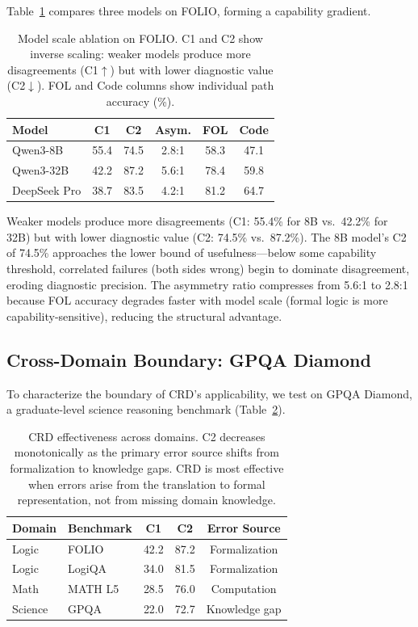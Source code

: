 \documentclass[11pt,a4paper]{article}
\begin{document}
Table~\ref{tab:scale} compares three models on FOLIO, forming a capability gradient.

\begin{table}[t]
\centering
\small
\begin{tabular}{lccccc}
\toprule
\textbf{Model} & \textbf{C1} & \textbf{C2} & \textbf{Asym.} & \textbf{FOL} & \textbf{Code} \\
\midrule
Qwen3-8B & 55.4 & 74.5 & 2.8:1 & 58.3 & 47.1 \\
Qwen3-32B & 42.2 & 87.2 & 5.6:1 & 78.4 & 59.8 \\
DeepSeek Pro & 38.7 & 83.5 & 4.2:1 & 81.2 & 64.7 \\
\bottomrule
\end{tabular}
\caption{Model scale ablation on FOLIO. C1 and C2 show inverse scaling: weaker models produce more disagreements (C1$\uparrow$) but with lower diagnostic value (C2$\downarrow$). FOL and Code columns show individual path accuracy (\%).}
\label{tab:scale}
\end{table}

Weaker models produce more disagreements (C1: 55.4\% for 8B vs.\ 42.2\% for 32B) but with lower diagnostic value (C2: 74.5\% vs.\ 87.2\%). The 8B model's C2 of 74.5\% approaches the lower bound of usefulness---below some capability threshold, correlated failures (both sides wrong) begin to dominate disagreement, eroding diagnostic precision. The asymmetry ratio compresses from 5.6:1 to 2.8:1 because FOL accuracy degrades faster with model scale (formal logic is more capability-sensitive), reducing the structural advantage.

\subsection{Cross-Domain Boundary: GPQA Diamond}
\label{sec:gpqa}

To characterize the boundary of CRD's applicability, we test on GPQA Diamond, a graduate-level science reasoning benchmark (Table~\ref{tab:cross_domain}).

\begin{table}[t]
\centering
\small
\begin{tabular}{llccc}
\toprule
\textbf{Domain} & \textbf{Benchmark} & \textbf{C1} & \textbf{C2} & \textbf{Error Source} \\
\midrule
Logic & FOLIO & 42.2 & 87.2 & Formalization \\
Logic & LogiQA & 34.0 & 81.5 & Formalization \\
Math & MATH L5 & 28.5 & 76.0 & Computation \\
Science & GPQA & 22.0 & 72.7 & Knowledge gap \\
\bottomrule
\end{tabular}
\caption{CRD effectiveness across domains. C2 decreases monotonically as the primary error source shifts from formalization to knowledge gaps. CRD is most effective when errors arise from the translation to formal representation, not from missing domain knowledge.}
\label{tab:cross_domain}
\end{table}
\end{document}
